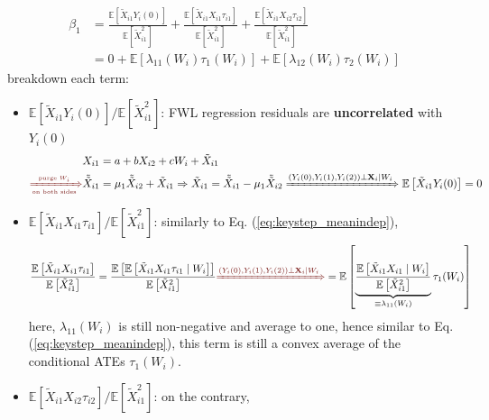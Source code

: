 \documentclass[twoside]{article}
\begin{document}
\begin{align}
    \beta_1 &= \frac{\mathbb{E}\left[ \tilde{X}_{i1}Y_i(0) \right]}{\mathbb{E}\left[ \tilde{X}^2_{i1} \right]} + \frac{\mathbb{E}\left[ \tilde{X}_{i1} X_{i1}\tau_{i1} \right]}{\mathbb{E}\left[ \tilde{X}^2_{i1} \right]} + \frac{\mathbb{E}\left[ \tilde{X}_{i1} X_{i2}\tau_{i2} \right]}{\mathbb{E}\left[ \tilde{X}^2_{i1} \right]} \nonumber \\
    &= 0 + \mathbb{E}\left[\lambda_{11}(W_i)\tau_1 (W_i)\right] + \mathbb{E}\left[ \lambda_{12}(W_i)\tau_2(W_i) \right]
\end{align}
breakdown each term:
\begin{itemize}
    \item $\mathbb{E}\left[\tilde{X}_{i1}Y_i(0)\right]/\mathbb{E}\left[\tilde{X}_{i1}^2\right]$: FWL regression residuals are \textbf{uncorrelated} with $Y_i(0)$
    \begin{align*}
       X_{i1}&=a + bX_{i2} + cW_i +\tilde{X}_{i1} \\
        \textcolor{myred}{\xRightarrow[\text{\tiny on both sides}]{\text{\tiny purge $W_i$}}} \tilde{\tilde{X}}_{i1} &= \mu_1\tilde{\tilde{X}}_{i2} + \tilde{X}_{i1} \Rightarrow \tilde{X}_{i1} = \tilde{\tilde{X}}_{i1} - \mu_1 \tilde{\tilde{X}}_{i2} \xRightarrow{\left( Y_i(0),Y_i(1),Y_i(2) \right) \bot \mathbf{X}_i \mid W_i} \mathbb{E}\left[\tilde{X}_{i1}Y_i(0)\right] = 0
    \end{align*}
    \item $\mathbb{E}\left[ \tilde{X}_{i1} X_{i1}\tau_{i1} \right]/\mathbb{E}\left[ \tilde{X}^2_{i1} \right]$: similarly to Eq. (\ref{eq:keystep_meanindep}), 
    \begin{align*}
        \frac{\mathbb{E}\left[ \tilde{X}_{i1} X_{i1}\tau_{i1} \right]}{\mathbb{E}\left[ \tilde{X}^2_{i1} \right]} &= \frac{\mathbb{E}\left[ \mathbb{E}\left[\tilde{X}_{i1} X_{i1}\tau_{i1}\mid W_i\right] \right]}{\mathbb{E}\left[ \tilde{X}^2_{i1} \right]} \textcolor{myred}{\xRightarrow{\left( Y_i(0),Y_i(1),Y_i(2) \right) \bot \mathbf{X}_i \mid W_i}} = \mathbb{E}\left[ \underbrace{\frac{\mathbb{E}\left[\tilde{X}_{i1}X_{i1}\mid W_i\right]}{\mathbb{E}\left[\tilde{X}_{i1}^2\right]}}_{\equiv \lambda_{11}(W_i)}\tau_1(W_i) \right]
    \end{align*}
    here, $\lambda_{11}(W_i)$ is still non-negative and average to one, hence similar to Eq. (\ref{eq:keystep_meanindep}), this term is still a convex average of the conditional ATEs $\tau_1(W_i)$.
    \item $\mathbb{E}\left[ \tilde{X}_{i1} X_{i2}\tau_{i2} \right]/\mathbb{E}\left[ \tilde{X}^2_{i1} \right]$: on the contrary,

\end{itemize}
\end{document}
